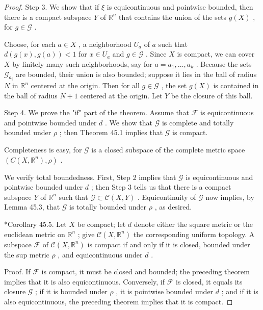 \begin{proof}
Step 3. We show that if \(\xi\) is equicontinuous and pointwise bounded, then there is a compact subspace \(Y\) of \({\mathbb{R}}^{n}\) that contains the union of the sets \(g\left( X\right)\) , for \(g \in  \mathcal{G}\) .

Choose, for each \(a \in  X\) , a neighborhood \({U}_{a}\) of \(a\) such that \(d\left( {g\left( x\right) ,g\left( a\right) }\right)  < 1\) for \(x \in  {U}_{a}\) and \(g \in  \mathcal{G}\) . Since \(X\) is compact, we can cover \(X\) by finitely many such neighborhoods, say for \(a = {a}_{1},\ldots ,{a}_{k}\) . Because the sets \({\mathcal{G}}_{{a}_{i}}\) are bounded, their union is also bounded; suppose it lies in the ball of radius \(N\) in \({\mathbb{R}}^{n}\) centered at the origin. Then for all \(g \in  \mathcal{G}\) , the set \(g\left( X\right)\) is contained in the ball of radius \(N + 1\) centered at the origin. Let \(Y\) be the closure of this ball.

Step 4. We prove the "if" part of the theorem. Assume that \(\mathcal{F}\) is equicontinuous and pointwise bounded under \(d\) . We show that \(\mathcal{G}\) is complete and totally bounded under \(\rho\) ; then Theorem 45.1 implies that \(\mathcal{G}\) is compact.

Completeness is easy, for \(\mathcal{G}\) is a closed subspace of the complete metric space \(\left( {C\left( {X,{\mathbb{R}}^{n}}\right) ,\rho }\right)\) .

We verify total boundedness. First, Step 2 implies that \(\mathcal{G}\) is equicontinuous and pointwise bounded under \(d\) ; then Step 3 tells us that there is a compact subspace \(Y\) of \({\mathbb{R}}^{n}\) such that \(\mathcal{G} \subset  \mathcal{C}\left( {X,Y}\right)\) . Equicontinuity of \(\mathcal{G}\) now implies, by Lemma 45.3, that \(\mathcal{G}\) is totally bounded under \(\rho\) , as desired.

*Corollary 45.5. Let \(X\) be compact; let \(d\) denote either the square metric or the euclidean metric on \({\mathbb{R}}^{n}\) ; give \(\mathcal{C}\left( {X,{\mathbb{R}}^{n}}\right)\) the corresponding uniform topology. A subspace \(\mathcal{F}\) of \(\mathcal{C}\left( {X,{\mathbb{R}}^{n}}\right)\) is compact if and only if it is closed, bounded under the sup metric \(\rho\) , and equicontinuous under \(d\) .

Proof. If \(\mathcal{F}\) is compact, it must be closed and bounded; the preceding theorem implies that it is also equicontinuous. Conversely, if \(\mathcal{F}\) is closed, it equals its closure \(\mathcal{G}\) ; if it is bounded under \(\rho\) , it is pointwise bounded under \(d\) ; and if it is also equicontinuous, the preceding theorem implies that it is compact.
\end{proof}
